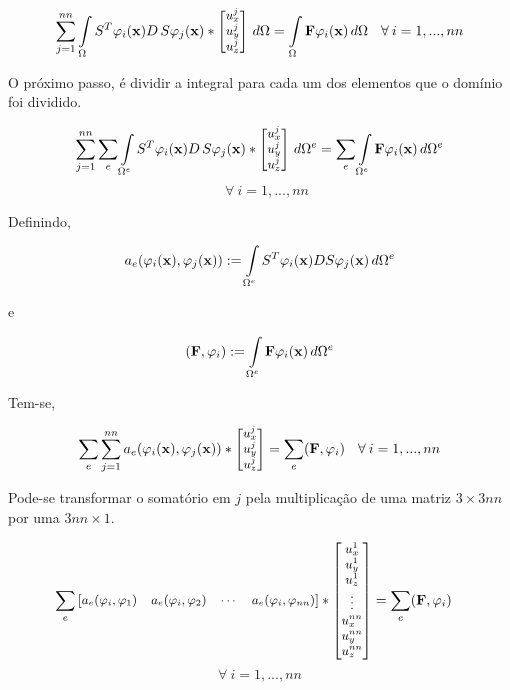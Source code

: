 \begin{equation}\small
\sum_{j=1}^{nn} \int\limits_{\Omega} S^T \varphi_i(\mathbf{x}) D\,S   \varphi_j(\mathbf{x})
 * \begin{bmatrix} u^j_x \\ u^j_y \\ u^j_z \end{bmatrix}
 \, d\Omega   =  \int\limits_{\Omega} \mathbf{F}\varphi_i(\mathbf{x}) \, d\Omega \quad \forall \: i=1,...,nn
\end{equation}

O próximo passo, é dividir a integral para cada um dos elementos que o domínio foi dividido.

\begin{equation*}\small
\sum_{j=1}^{nn} \sum\limits_e \int\limits_{\Omega^e} S^T \varphi_i(\mathbf{x}) D\,S  \varphi_j(\mathbf{x})
 * \begin{bmatrix} u^j_x \\ u^j_y \\ u^j_z \end{bmatrix}
 \, d\Omega^e   =  \sum\limits_e \int\limits_{\Omega^e} \mathbf{F}\varphi_i(\mathbf{x}) \, d\Omega^e
\end{equation*}
\begin{equation*}
 \quad \forall \: i=1,...,nn
\end{equation*}

Definindo,

\begin{equation} \label{eq:ae_def}
 a_e(\varphi_i(\mathbf{x}),\varphi_j(\mathbf{x})) := \int\limits_{\Omega^e} S^T\varphi_i(\mathbf{x}) D S\varphi_j(\mathbf{x}) \, d\Omega^e
\end{equation}

e

\begin{equation}
(\mathbf{F}, \varphi_{i}) := \int\limits_{\Omega^e} \mathbf{F}\varphi_i(\mathbf{x}) \, d\Omega^e
\end{equation}

Tem-se,

\begin{equation}\small
\sum\limits_e \sum_{j=1}^{nn} a_e(\varphi_i(\mathbf{x}),\varphi_j(\mathbf{x}))  * \begin{bmatrix} u^j_x \\ u^j_y \\ u^j_z \end{bmatrix}
=  \sum\limits_e (\mathbf{F}, \varphi_{i}) \quad \forall \: i=1,...,nn
\end{equation}


Pode-se transformar o somatório em $j$ pela multiplicação de uma matriz $3\times3nn$ por uma $3nn\times1$.

\begin{equation}\small
\sum\limits_e  \begin{bmatrix} a_e(\varphi_{i}, \varphi_{1}) & a_e(\varphi_{i}, \varphi_{2}) & \cdots & a_e(\varphi_{i}, \varphi_{nn}) \end{bmatrix}  * \begin{bmatrix} u^{1}_x \\ u^{1}_y \\ u^{1}_z \\ \vdots\\ u^{nn}_x \\ u^{nn}_y \\ u^{nn}_z \end{bmatrix}
=  \sum\limits_e (\mathbf{F}, \varphi_{i}) \quad
\end{equation}
\begin{equation*}
  \forall \: i=1,...,nn
\end{equation*}


